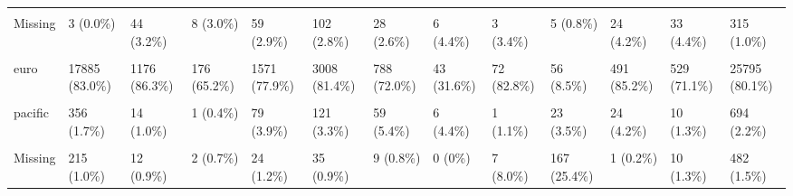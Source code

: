 \documentclass[
  single column]{article}
\begin{document}
\begin{landscape}
\begin{longtable}[t]{lllllllllllll}
\cellcolor{gray!10}{Median [Min, Max]} & \cellcolor{gray!10}{1.00 [0, 1.00]} & \cellcolor{gray!10}{1.00 [0, 1.00]} & \cellcolor{gray!10}{1.00 [0, 1.00]} & \cellcolor{gray!10}{1.00 [0, 1.00]} & \cellcolor{gray!10}{1.00 [0, 1.00]} & \cellcolor{gray!10}{1.00 [0, 1.00]} & \cellcolor{gray!10}{1.00 [0, 1.00]} & \cellcolor{gray!10}{1.00 [0, 1.00]} & \cellcolor{gray!10}{1.00 [0, 1.00]} & \cellcolor{gray!10}{1.00 [0, 1.00]} & \cellcolor{gray!10}{1.00 [0, 1.00]} & \cellcolor{gray!10}{1.00 [0, \vphantom{1} 1.00]}\\
Missing & 3 (0.0\%) & 44 (3.2\%) & 8 (3.0\%) & 59 (2.9\%) & 102 (2.8\%) & 28 (2.6\%) & 6 (4.4\%) & 3 (3.4\%) & 5 (0.8\%) & 24 (4.2\%) & 33 (4.4\%) & 315 (1.0\%)\\
\addlinespace
\cellcolor{gray!10}{Ethnicity Category} & \cellcolor{gray!10}{} & \cellcolor{gray!10}{} & \cellcolor{gray!10}{} & \cellcolor{gray!10}{} & \cellcolor{gray!10}{} & \cellcolor{gray!10}{} & \cellcolor{gray!10}{} & \cellcolor{gray!10}{} & \cellcolor{gray!10}{} & \cellcolor{gray!10}{} & \cellcolor{gray!10}{} & \cellcolor{gray!10}{}\\
euro & 17885 (83.0\%) & 1176 (86.3\%) & 176 (65.2\%) & 1571 (77.9\%) & 3008 (81.4\%) & 788 (72.0\%) & 43 (31.6\%) & 72 (82.8\%) & 56 (8.5\%) & 491 (85.2\%) & 529 (71.1\%) & 25795 (80.1\%)\\
\cellcolor{gray!10}{maori} & \cellcolor{gray!10}{2335 (10.8\%)} & \cellcolor{gray!10}{143 (10.5\%)} & \cellcolor{gray!10}{23 (8.5\%)} & \cellcolor{gray!10}{194 (9.6\%)} & \cellcolor{gray!10}{340 (9.2\%)} & \cellcolor{gray!10}{205 (18.7\%)} & \cellcolor{gray!10}{5 (3.7\%)} & \cellcolor{gray!10}{6 (6.9\%)} & \cellcolor{gray!10}{13 (2.0\%)} & \cellcolor{gray!10}{59 (10.2\%)} & \cellcolor{gray!10}{159 (21.4\%)} & \cellcolor{gray!10}{3482 (10.8\%)}\\
pacific & 356 (1.7\%) & 14 (1.0\%) & 1 (0.4\%) & 79 (3.9\%) & 121 (3.3\%) & 59 (5.4\%) & 6 (4.4\%) & 1 (1.1\%) & 23 (3.5\%) & 24 (4.2\%) & 10 (1.3\%) & 694 (2.2\%)\\
\cellcolor{gray!10}{asian} & \cellcolor{gray!10}{760 (3.5\%)} & \cellcolor{gray!10}{18 (1.3\%)} & \cellcolor{gray!10}{68 (25.2\%)} & \cellcolor{gray!10}{149 (7.4\%)} & \cellcolor{gray!10}{192 (5.2\%)} & \cellcolor{gray!10}{34 (3.1\%)} & \cellcolor{gray!10}{82 (60.3\%)} & \cellcolor{gray!10}{1 (1.1\%)} & \cellcolor{gray!10}{399 (60.6\%)} & \cellcolor{gray!10}{1 (0.2\%)} & \cellcolor{gray!10}{36 (4.8\%)} & \cellcolor{gray!10}{1740 (5.4\%)}\\
\addlinespace
Missing & 215 (1.0\%) & 12 (0.9\%) & 2 (0.7\%) & 24 (1.2\%) & 35 (0.9\%) & 9 (0.8\%) & 0 (0\%) & 7 (8.0\%) & 167 (25.4\%) & 1 (0.2\%) & 10 (1.3\%) & 482 (1.5\%)\\

\end{longtable}
\end{landscape}
\end{document}
